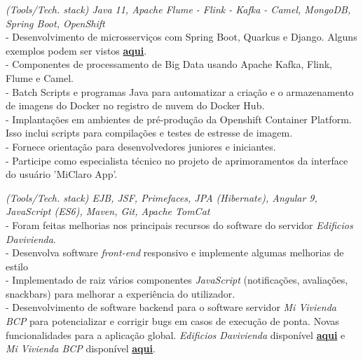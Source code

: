 \documentclass[]{CV-JuanCamiloFlorez}
\begin{document}
\begin{minipage}[t]{0.66\textwidth}
    \textit{(Tools/Tech. stack) Java 11, Apache Flume - Flink - Kafka - Camel, MongoDB, Spring Boot, OpenShift} \\
        - Desenvolvimento de microsserviços com Spring Boot, Quarkus e Django. Alguns exemplos podem ser vistos \textbf{\href{https://github.com/VanJFlorez/flink-kafka-fraud-detection}{aqui}}. \\
        - Componentes de processamento de Big Data usando Apache Kafka, Flink, Flume e Camel. \\
        - Batch Scripts e programas Java para automatizar a criação e o armazenamento de imagens do Docker no registro de nuvem do Docker Hub. \\
        - Implantações em ambientes de pré-produção da Openshift Container Platform. Isso inclui scripts para compilações e testes de estresse de imagem. \\
        - Fornece orientação para desenvolvedores juniores e iniciantes. \\
        - Participe como especialista técnico no projeto de aprimoramentos da interface do usuário 'MiClaro App'. \\
        \sectionsep

    \textit{(Tools/Tech. stack) EJB, JSF, Primefaces, JPA (Hibernate), Angular 9, JavaScript (ES6), Maven, Git, Apache TomCat} \\
        - Foram feitas melhorias nos principais recursos do software do servidor \textit{Edificios Davivienda}. \\
        - Desenvolva software \textit{front-end} responsivo e implemente algumas melhorias de estilo \\
        - Implementado de raiz vários componentes \textit{JavaScript} (notificações, avaliações, snackbars) para melhorar a experiência do utilizador. \\
        - Desenvolvimento de software backend para o software servidor \textit{Mi Vivienda BCP} para potencializar e corrigir bugs em casos de execução de ponta. Novas funcionalidades para a aplicação global. \textit{Edificios Davivienda} disponível \textbf{\href{https://www.edificiosdavivienda.com}{aqui}} e \textit{Mi Vivienda BCP} disponível \textbf{\href{https://www.miviviendabcp.com.bo}{aqui}}. \\
        \sectionsep


\end{minipage}
\end{document}
